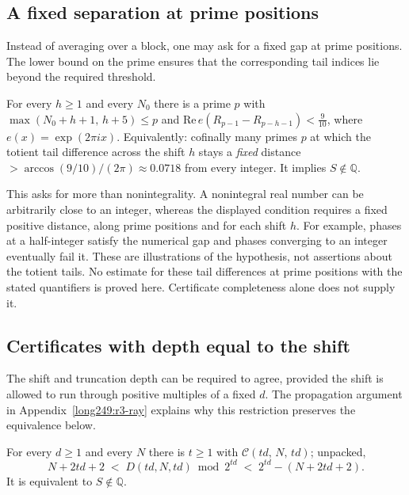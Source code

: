 \subsection{A fixed separation at prime positions}

Instead of averaging over a block, one may ask for a fixed gap at
prime positions. The lower bound on the prime ensures that the
corresponding tail indices lie beyond the required threshold.

\begin{defn}
\label{defn:primegap}
For every $h \ge 1$ and every $N_0$ there is a prime $p$ with
$\max(N_0{+}h{+}1,\, h{+}5) \le p$ and
$\mathrm{Re}\,e(R_{p-1}-R_{p-h-1}) < \tfrac{9}{10}$,
where $e(x)=\exp(2\pi i x)$. Equivalently:
cofinally many primes $p$ at which the totient tail difference across the shift
$h$ stays a \emph{fixed} distance
$> \arccos(9/10)/(2\pi) \approx 0.0718$ from every integer.
It implies $S\notin\mathbb Q$.
\end{defn}

This asks for more than nonintegrality. A nonintegral real number can
be arbitrarily close to an integer, whereas the displayed condition requires
a fixed positive distance, along prime positions and for each shift $h$.
For example, phases at a half-integer satisfy the numerical gap and phases
converging to an integer eventually fail it. These are illustrations of the
hypothesis, not assertions about the totient tails. No estimate for these tail differences at prime positions
with the stated quantifiers is proved here. Certificate completeness alone
does not supply it.

\subsection{Certificates with depth equal to the shift}

The shift and truncation depth can be required to agree, provided
the shift is allowed to run through positive multiples of a fixed
$d$. The propagation argument in Appendix~\ref{long249:r3-ray}
explains why this restriction preserves the equivalence below.

\begin{defn}
\label{defn:apfde}
For every $d \ge 1$ and every $N$ there is $t \ge 1$ with
$\mathcal{C}(td,\,N,\,td)$; unpacked,
\[
  N + 2td + 2 \;<\; {D}(td,N,td) \bmod 2^{td}
  \;<\; 2^{td} - (N + 2td + 2).
\]
It is equivalent to $S\notin\mathbb Q$.
\end{defn}

